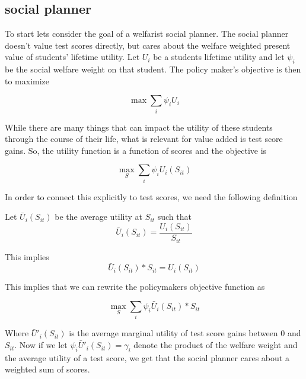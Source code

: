 \documentclass{article}
\theoremstyle{definition}
\theoremstyle{definition}
\theoremstyle{definition}
\begin{document}
\subsection{social planner}
To start lets consider the goal of a welfarist social planner. The social planner doesn't value test scores directly, but cares about the welfare weighted present value of students' lifetime utility. Let $U_i$ be a students lifetime utility and let $\psi_i$ be the social welfare weight on that student. The policy maker's objective is then to maximize

\begin{equation}
 \max \sum_i \psi_i U_{i}
\end{equation}

While there are many things that can impact the utility of these students through the course of their life, what is relevant for value added is test score gains. So, the utility function is a function of scores and the objective is

\begin{equation}
 \max_S \sum_i \psi_i U_{i}(S_{it})
\end{equation}

In order to connect this explicitly to test scores, we need the following definition 

\begin{definition}
Let $\bar{U}_{i}(S_{it})$ be the average utility  at $S_{it}$ such that 
\begin{equation}
     \bar{U}_{i}(S_{it}) = \frac{U_{i}(S_{it})}{S_{it}}
\end{equation}

This implies
\begin{equation}
    \bar{U}_{i}(S_{it}) * S_{it} = U_{i}(S_{it})
\end{equation}
\end{definition}

This implies that we can rewrite the policymakers objective function as 

\begin{equation}
   \max_S  \sum_i \psi_i \bar{U}_{i}(S_{it}) * S_{it}
\end{equation}


Where $\bar{U}'_{i}(S_{it}) $ is the average marginal utility of test score gains between $0$ and $S_{it}$. Now if we let $\psi_i \bar{U}'_{i}(S_{it}) = \gamma_i$ denote the product of the welfare weight and the average utility of a test score, we get that the social planner cares about a weighted sum of scores. 
\end{document}

